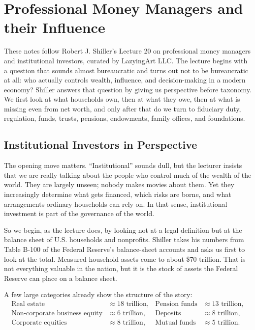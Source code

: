 \chapter{Professional Money Managers and their Influence}

These notes follow Robert J. Shiller's Lecture 20 on professional money managers and institutional investors, curated by LazyingArt LLC. The lecture begins with a question that sounds almost bureaucratic and turns out not to be bureaucratic at all: who actually controls wealth, influence, and decision-making in a modern economy? Shiller answers that question by giving us perspective before taxonomy. We first look at what households own, then at what they owe, then at what is missing even from net worth, and only after that do we turn to fiduciary duty, regulation, funds, trusts, pensions, endowments, family offices, and foundations.

\section{Institutional Investors in Perspective}

The opening move matters. ``Institutional'' sounds dull, but the lecturer insists that we are really talking about the people who control much of the wealth of the world. They are largely unseen; nobody makes movies about them. Yet they increasingly determine what gets financed, which risks are borne, and what arrangements ordinary households can rely on. In that sense, institutional investment is part of the governance of the world.

So we begin, as the lecture does, by looking not at a legal definition but at the balance sheet of U.S. households and nonprofits. Shiller takes his numbers from Table B-100 of the Federal Reserve's balance-sheet accounts and asks us first to look at the total. Measured household assets come to about \$70 trillion. That is not everything valuable in the nation, but it is the stock of assets the Federal Reserve can place on a balance sheet.

A few large categories already show the structure of the story:
\begin{align}
\text{Real estate} &\approx 18 \text{ trillion}, &
\text{Pension funds} &\approx 13 \text{ trillion}, \\
\text{Non-corporate business equity} &\approx 6 \text{ trillion}, &
\text{Deposits} &\approx 8 \text{ trillion}, \\
\text{Corporate equities} &\approx 8 \text{ trillion}, &
\text{Mutual funds} &\approx 5 \text{ trillion}.
\end{align}

